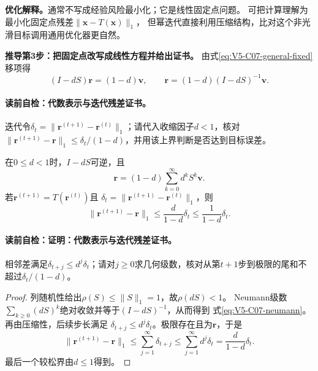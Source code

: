 \label{struct:V5-C07-CH16}
\textbf{优化解释。}\PageRank{}通常不写成经验风险最小化；它是线性固定点问题。
可把计算理解为最小化固定点残差$\|\boldsymbol x-T(\boldsymbol x)\|_1$，
但幂迭代直接利用压缩结构，比对这个非光滑目标调用通用优化器更自然。

\textbf{推导第3步：把固定点改写成线性方程并给出证书。}
由式\eqref{eq:V5-C07-general-fixed}移项得
\begin{equation}
(I-dS)\boldsymbol r=(1-d)\boldsymbol v,\qquad
\boldsymbol r=(1-d)(I-dS)^{-1}\boldsymbol v.
\label{eq:V5-C07-linear-system}
\end{equation}
\paragraph{读前自检：代数表示与迭代残差证书。}\PageRank{}迭代令$\delta_t=\lVert\boldsymbol r^{(t+1)}-\boldsymbol r^{(t)}\rVert_1$；请代入收缩因子$d<1$，核对$\lVert\boldsymbol r^{(t+1)}-\boldsymbol r\rVert_1\le\delta_t/(1-d)$，并用该上界判断是否达到目标误差。\par

\begin{proposition}[代数表示与迭代残差证书]\label{prop:V5-C07-linear-residual}
在$0\le d<1$时，$I-dS$可逆，且
\begin{equation}
\boldsymbol r=(1-d)\sum_{k=0}^{\infty}d^kS^k\boldsymbol v.
\label{eq:V5-C07-neumann}
\end{equation}
若$\boldsymbol r^{(t+1)}=T(\boldsymbol r^{(t)})$且
$\delta_t=\|\boldsymbol r^{(t+1)}-\boldsymbol r^{(t)}\|_1$，则
\begin{equation}
\|\boldsymbol r^{(t+1)}-\boldsymbol r\|_1
\le\frac{d}{1-d}\delta_t
\le\frac{1}{1-d}\delta_t.
\label{eq:V5-C07-residual-certificate}
\end{equation}
\end{proposition}
\paragraph{读前自检：证明：代数表示与迭代残差证书。}\PageRank{}相邻差满足$\delta_{t+j}\le d^j\delta_t$；请对$j\ge0$求几何级数，核对从第$t+1$步到极限的尾和不超过$\delta_t/(1-d)$。\par

\begin{proof}
列随机性给出$\rho(S)\le\|S\|_1=1$，故$\rho(dS)<1$。
Neumann级数$\sum_{k\ge0}(dS)^k$绝对收敛并等于$(I-dS)^{-1}$，从而得到
式\eqref{eq:V5-C07-neumann}。再由压缩性，后续步长满足
$\delta_{t+j}\le d^j\delta_t$。极限存在且为$\boldsymbol r$，于是
\[
\|\boldsymbol r^{(t+1)}-\boldsymbol r\|_1
\le\sum_{j=1}^{\infty}\delta_{t+j}
\le\sum_{j=1}^{\infty}d^j\delta_t
=\frac{d}{1-d}\delta_t.
\]
最后一个较松界由$d\le1$得到。
\end{proof}

